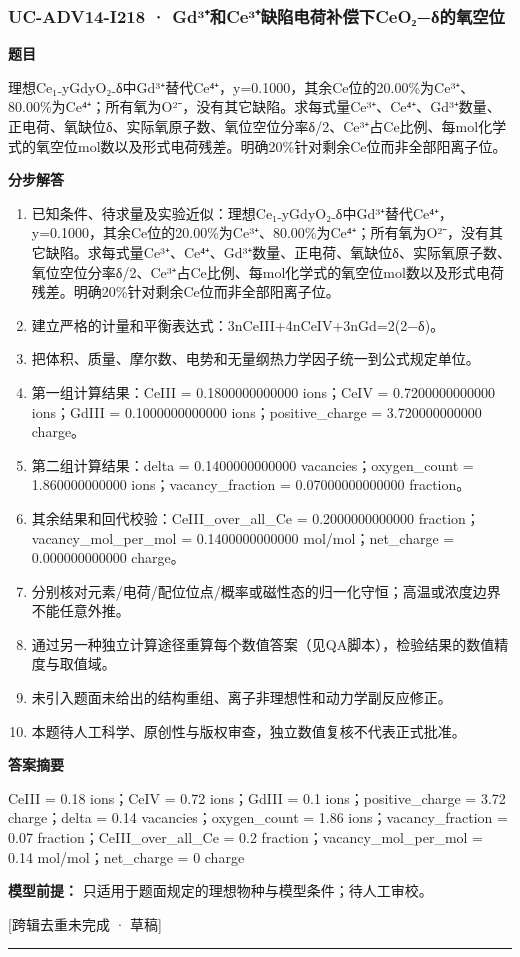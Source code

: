 \documentclass[UTF8,11pt,a4paper]{ctexart}
\begin{document}
\subsubsection*{UC-ADV14-I218 · Gd³⁺和Ce³⁺缺陷电荷补偿下CeO₂−δ的氧空位}
\noindent\textbf{题目}\par
理想Ce₁₋yGdyO₂₋δ中Gd³⁺替代Ce⁴⁺，y=0.1000，其余Ce位的20.00\%为Ce³⁺、80.00\%为Ce⁴⁺；所有氧为O²⁻，没有其它缺陷。求每式量Ce³⁺、Ce⁴⁺、Gd³⁺数量、正电荷、氧缺位δ、实际氧原子数、氧位空位分率δ/2、Ce³⁺占Ce比例、每mol化学式的氧空位mol数以及形式电荷残差。明确20\%针对剩余Ce位而非全部阳离子位。\par
\medskip\noindent\textbf{分步解答}
\begin{enumerate}
\item 已知条件、待求量及实验近似：理想Ce₁₋yGdyO₂₋δ中Gd³⁺替代Ce⁴⁺，y=0.1000，其余Ce位的20.00\%为Ce³⁺、80.00\%为Ce⁴⁺；所有氧为O²⁻，没有其它缺陷。求每式量Ce³⁺、Ce⁴⁺、Gd³⁺数量、正电荷、氧缺位δ、实际氧原子数、氧位空位分率δ/2、Ce³⁺占Ce比例、每mol化学式的氧空位mol数以及形式电荷残差。明确20\%针对剩余Ce位而非全部阳离子位。
\item 建立严格的计量和平衡表达式：3nCeIII+4nCeIV+3nGd=2(2−δ)。
\item 把体积、质量、摩尔数、电势和无量纲热力学因子统一到公式规定单位。
\item 第一组计算结果：CeIII = 0.1800000000000 ions；CeIV = 0.7200000000000 ions；GdIII = 0.1000000000000 ions；positive\_charge = 3.720000000000 charge。
\item 第二组计算结果：delta = 0.1400000000000 vacancies；oxygen\_count = 1.860000000000 ions；vacancy\_fraction = 0.07000000000000 fraction。
\item 其余结果和回代校验：CeIII\_over\_all\_Ce = 0.2000000000000 fraction；vacancy\_mol\_per\_mol = 0.1400000000000 mol/mol；net\_charge = 0.000000000000 charge。
\item 分别核对元素/电荷/配位位点/概率或磁性态的归一化守恒；高温或浓度边界不能任意外推。
\item 通过另一种独立计算途径重算每个数值答案（见QA脚本），检验结果的数值精度与取值域。
\item 未引入题面未给出的结构重组、离子非理想性和动力学副反应修正。
\item 本题待人工科学、原创性与版权审查，独立数值复核不代表正式批准。
\end{enumerate}
\noindent\textbf{答案摘要}\par
CeIII = 0.18 ions；CeIV = 0.72 ions；GdIII = 0.1 ions；positive\_charge = 3.72 charge；delta = 0.14 vacancies；oxygen\_count = 1.86 ions；vacancy\_fraction = 0.07 fraction；CeIII\_over\_all\_Ce = 0.2 fraction；vacancy\_mol\_per\_mol = 0.14 mol/mol；net\_charge = 0 charge\par
\noindent\textbf{模型前提：}
只适用于题面规定的理想物种与模型条件；待人工审校。\par
\noindent\textcolor{red!65!black}{[跨辑去重未完成 · 草稿]} \par
\medskip\hrule\medskip
{}
\end{document}
